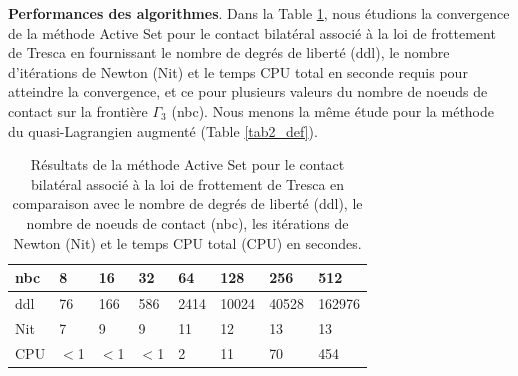 \noindent\textbf{Performances des algorithmes}.
Dans la Table \ref{tab1_def}, nous étudions la convergence de la méthode Active Set pour le contact bilatéral associé à la loi de frottement de Tresca en fournissant le nombre de degrés de liberté (ddl), le nombre d'itérations de Newton (Nit) et le temps CPU total en seconde requis pour atteindre la convergence, et ce pour plusieurs valeurs du nombre de noeuds de contact sur la frontière $\Gamma_3$ (nbc). Nous menons la même étude pour la méthode du quasi-Lagrangien augmenté (Table \ref{tab2_def}).
\begin{table}[htbp!]
\begin{tabular}{ |p{1.25cm}|p{1.25cm}|p{1.25cm}|p{1.25cm}|p{1.25cm}|p{1.25cm}|p{1.25cm}|p{1.25cm}| }
 \hline \rowcolor{lightgray}
 nbc & 8 & 16 & 32 & 64 & 128 & 256 & 512 \\
			\hline
			ddl & 76 & 166 & 586 & 2414 & 10024 & 40528 & 162976 \\
			Nit &  7 & 9 & 9 & 11 & 12 & 13 & 13 \\
			CPU &  $<$1 & $<$1 & $<$1 & 2 & 11 & 70 & 454  \\
 \hline
\end{tabular}
\caption{Résultats de la méthode Active Set pour le contact bilatéral associé à la loi de             frottement de Tresca
	    en comparaison avec le nombre de degrés de liberté (ddl), le nombre de noeuds de contact (nbc), les itérations de Newton (Nit) et le temps CPU total (CPU) en secondes.}\label{tab1_def}
\end{table}

